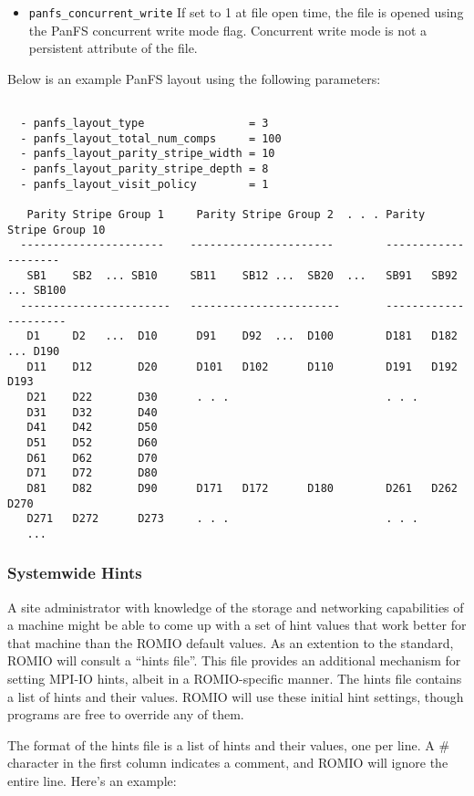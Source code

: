 \begin{itemize}
\item \texttt{panfs\_concurrent\_write} If set to 1 at file open time,
the file is opened using the PanFS concurrent write mode flag.
Concurrent write mode is not a persistent attribute of the file.
\end{itemize}

Below is an example PanFS layout using the following parameters:
\begin{verbatim}
 
  - panfs_layout_type                = 3
  - panfs_layout_total_num_comps     = 100
  - panfs_layout_parity_stripe_width = 10
  - panfs_layout_parity_stripe_depth = 8
  - panfs_layout_visit_policy        = 1

   Parity Stripe Group 1     Parity Stripe Group 2  . . . Parity Stripe Group 10
  ----------------------    ----------------------        --------------------
   SB1    SB2  ... SB10     SB11    SB12 ...  SB20  ...   SB91   SB92 ... SB100
  -----------------------   -----------------------       ---------------------
   D1     D2   ...  D10      D91    D92  ...  D100        D181   D182  ... D190
   D11    D12       D20      D101   D102      D110        D191   D192      D193
   D21    D22       D30      . . .                        . . .
   D31    D32       D40
   D41    D42       D50
   D51    D52       D60
   D61    D62       D70
   D71    D72       D80
   D81    D82       D90      D171   D172      D180        D261   D262   D270
   D271   D272      D273     . . .                        . . .
   ...
\end{verbatim}

\subsubsection{Systemwide Hints}
\label{sec:system_hints}

A site administrator with knowledge of the storage and networking capabilities
of a machine might be able to come up with a set of hint values that work
better for that machine than the ROMIO default values.  As an extention to the
standard, ROMIO will consult a ``hints file''.  This file provides an
additional mechanism for setting MPI-IO hints, albeit in a ROMIO-specific
manner.  The hints file contains a list of hints and their values.  ROMIO will
use these initial hint settings, though programs are free to override any of
them.

The format of the hints file is a list of hints and their values, one per line.
A \# character in the first column indicates a comment, and ROMIO will ignore
the entire line.  Here's an example:

